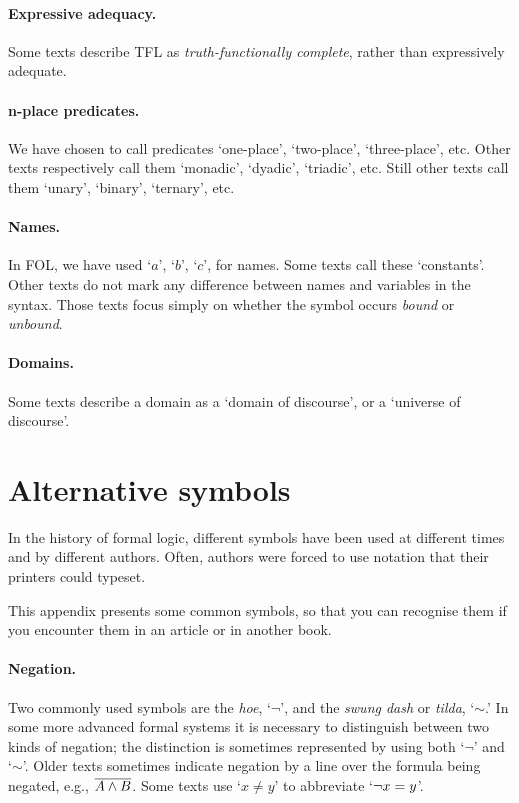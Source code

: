\paragraph{Expressive adequacy.} Some texts describe TFL as \emph{truth-functionally complete}, rather than expressively adequate.

\paragraph{n-place predicates.} We have chosen to call predicates `one-place', `two-place', `three-place', etc. Other texts respectively call them `monadic', `dyadic', `triadic', etc. Still other texts call them `unary', `binary', `ternary', etc.

\paragraph{Names.} In FOL, we have used `$a$', `$b$', `$c$', for names. Some texts call these `constants'. Other texts do not mark any difference between names and variables in the syntax. Those texts focus simply on  whether the symbol occurs \emph{bound} or \emph{unbound}. 

\paragraph{Domains.} Some texts describe a domain as a `domain of discourse', or a `universe of discourse'.

\section{Alternative symbols}
In the history of formal logic, different symbols have been used at different times and by different authors. Often, authors were forced to use notation that their printers could typeset.

This appendix presents some common symbols, so that you can recognise them if you encounter them in an article or in another book.

\paragraph{Negation.} Two commonly used symbols are the \emph{hoe}, `$\neg$', and the \emph{swung dash} or \emph{tilda}, `${\sim}$.' In some more advanced formal systems it is necessary to distinguish between two kinds of negation; the distinction is sometimes represented by using both `$\neg$' and `${\sim}$'. Older texts sometimes indicate negation by a line over the formula being negated, e.g., $\overline{A \wedge B}$. Some texts use `$x \neq y$' to abbreviate `$\neg x = y$'.

